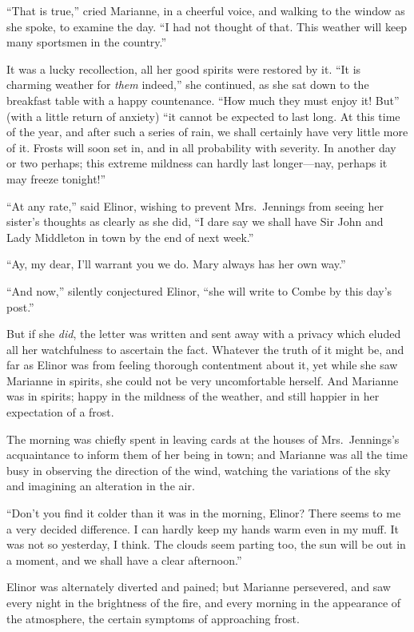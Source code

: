 ``That is true,'' cried Marianne, in a cheerful voice,
and walking to the window as she spoke, to examine the day.
``I had not thought of that.  This weather will keep many
sportsmen in the country.''

It was a lucky recollection, all her good spirits were
restored by it.  ``It is charming weather for \emph{them} indeed,''
she continued, as she sat down to the breakfast table
with a happy countenance.  ``How much they must enjoy
it! But'' (with a little return of anxiety) ``it cannot
be expected to last long.  At this time of the year,
and after such a series of rain, we shall certainly
have very little more of it.  Frosts will soon set in,
and in all probability with severity.  In another day
or two perhaps; this extreme mildness can hardly last
longer---nay, perhaps it may freeze tonight!''

``At any rate,'' said Elinor, wishing to prevent
Mrs.\ Jennings from seeing her sister's thoughts as clearly
as she did, ``I dare say we shall have Sir John and Lady
Middleton in town by the end of next week.''

``Ay, my dear, I'll warrant you we do.  Mary always
has her own way.''

``And now,'' silently conjectured Elinor, ``she will
write to Combe by this day's post.''

But if she \emph{did}, the letter was written and sent away
with a privacy which eluded all her watchfulness to ascertain
the fact.  Whatever the truth of it might be, and far
as Elinor was from feeling thorough contentment about it,
yet while she saw Marianne in spirits, she could not be
very uncomfortable herself.  And Marianne was in spirits;
happy in the mildness of the weather, and still happier
in her expectation of a frost.

The morning was chiefly spent in leaving cards at
the houses of Mrs.\ Jennings's acquaintance to inform
them of her being in town; and Marianne was all the time
busy in observing the direction of the wind, watching the
variations of the sky and imagining an alteration in the air.

``Don't you find it colder than it was in the morning,
Elinor? There seems to me a very decided difference.
I can hardly keep my hands warm even in my muff.  It was
not so yesterday, I think.  The clouds seem parting too,
the sun will be out in a moment, and we shall have a
clear afternoon.''

Elinor was alternately diverted and pained;
but Marianne persevered, and saw every night in the
brightness of the fire, and every morning in the appearance
of the atmosphere, the certain symptoms of approaching frost.

